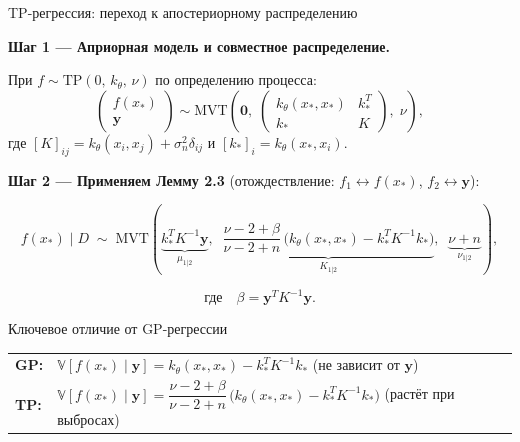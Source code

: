 \documentclass{beamer}
\begin{document}
\begin{frame}{TP-регрессия: переход к апостериорному распределению}

{\footnotesize

\textbf{Шаг 1 — Априорная модель и совместное распределение.}

При $f \sim \mathrm{TP}(0,\, k_\theta,\, \nu)$ по определению процесса:
$$
\begin{pmatrix} f(x_*) \\ \mathbf{y} \end{pmatrix}
\sim
\mathrm{MVT}\!\left(
\mathbf{0},\;
\begin{pmatrix}
  k_\theta(x_*,x_*) & k_*^T \\
  k_*               & K
\end{pmatrix},\;
\nu
\right),
$$
где $[K]_{ij} = k_\theta(x_i, x_j) + \sigma_n^2\delta_{ij}$
и $[k_*]_i = k_\theta(x_*, x_i)$.

\vspace{4pt}

\textbf{Шаг 2 — Применяем Лемму 2.3}
(отождествление: $f_1 \leftrightarrow f(x_*)$,\; $f_2 \leftrightarrow \mathbf{y}$):

$$
f(x_*)\mid D
\;\sim\;
\mathrm{MVT}\!\left(
\underbrace{k_*^T K^{-1} \mathbf{y}}_{\mu_{1|2}},\;\;
\underbrace{\dfrac{\nu - 2 + \beta}{\nu - 2 + n}
\,\bigl(k_\theta(x_*,x_*) - k_*^T K^{-1} k_*\bigr)}_{K_{1|2}},\;\;
\underbrace{\nu + n}_{\nu_{1|2}}
\right),
$$

$$
\text{где}\quad \beta = \mathbf{y}^T K^{-1} \mathbf{y}.
$$

\vspace{3pt}

\begin{block}{Ключевое отличие от GP-регрессии}
\begin{tabular}{ll}
\textbf{GP:} & $\mathbb{V}[f(x_*)\mid\mathbf{y}]
  = k_\theta(x_*,x_*) - k_*^TK^{-1}k_*$
  \quad (не зависит от $\mathbf{y}$)\\[4pt]
\textbf{TP:} & $\mathbb{V}[f(x_*)\mid\mathbf{y}]
  = \dfrac{\nu-2+\beta}{\nu-2+n}\,
  \bigl(k_\theta(x_*,x_*) - k_*^TK^{-1}k_*\bigr)$
  \quad (растёт при выбросах)
\end{tabular}
\end{block}

}
\end{frame}

\end{document}
